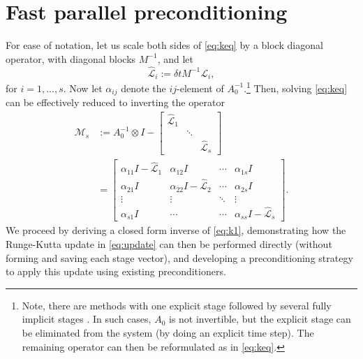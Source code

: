 \documentclass[review]{siamart}
\begin{document}
\section{Fast parallel preconditioning}\label{sec:solve}

For ease of notation, let us scale both sides of \eqref{eq:keq} by a block
diagonal operator, with diagonal blocks $M^{-1}$, and let
%
\begin{equation*}
\widehat{\mathcal{L}}_i := \delta t M^{-1}\mathcal{L}_i,
\end{equation*}
%
for $i=1,...,s$. Now let $\alpha_{ij}$ denote the $ij$-element
of $A_0^{-1}$.\footnote{Note, there are
methods with one explicit stage followed by several fully implicit stages \cite{butcher00}.
In such cases, $A_0$ is not invertible, but the explicit stage can
be eliminated from the system (by doing an explicit time step). The remaining operator
can then be reformulated as in \eqref{eq:keq}.}
Then, solving \eqref{eq:keq} can be effectively reduced to inverting the operator
%
\begin{align}\nonumber
\mathcal{M}_s & := A_0^{-1}\otimes I - \begin{bmatrix} \widehat{\mathcal{L}}_1  & \\ & \ddots \\ && \widehat{\mathcal{L}}_s\end{bmatrix} \\
& = \begin{bmatrix} \alpha_{11}I - \widehat{\mathcal{L}}_1 & \alpha_{12}I & \cdots & \alpha_{1s}I \\
	\alpha_{21}I & \alpha_{22}I - \widehat{\mathcal{L}}_2 & \cdots & \alpha_{2s}I \\
	\vdots & \vdots & \ddots & \vdots \\ \alpha_{s1}I & \cdots & \cdots & \alpha_{ss}I - \widehat{\mathcal{L}}_s \end{bmatrix}.
	\label{eq:k1}
\end{align}
%
We proceed by deriving a closed form inverse of \eqref{eq:k1}, demonstrating
how the Runge-Kutta update in \eqref{eq:update} can then be performed directly
(without forming and saving each stage vector), and developing a preconditioning
strategy to apply this update using existing preconditioners.
\end{document}
